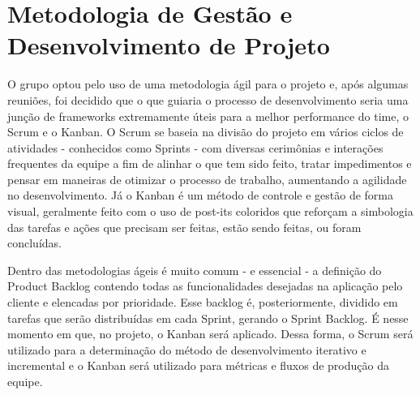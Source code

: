 \section{Metodologia de Gestão e Desenvolvimento de Projeto}
O grupo optou pelo uso de uma metodologia ágil para o projeto e, após algumas reuniões, foi decidido que o que guiaria o processo de desenvolvimento seria uma junção de frameworks extremamente úteis para a melhor performance do time, o Scrum e o Kanban. 
O Scrum se baseia na divisão do projeto em vários ciclos de atividades - conhecidos como Sprints - com diversas cerimônias e interações frequentes da equipe a fim de alinhar o que tem sido feito, tratar impedimentos e pensar em maneiras de otimizar o processo de trabalho, aumentando a agilidade no desenvolvimento. Já o Kanban é um método de controle e gestão de forma visual, geralmente feito com o uso de post-its coloridos que reforçam a simbologia das tarefas e ações que precisam ser feitas, estão sendo feitas, ou foram concluídas. 

Dentro das metodologias ágeis é muito comum - e essencial - a definição do Product Backlog contendo todas as funcionalidades desejadas na aplicação pelo cliente e elencadas por prioridade. Esse backlog é, posteriormente, dividido em tarefas que serão distribuídas em cada Sprint, gerando o Sprint Backlog. É nesse momento em que, no projeto, o Kanban será aplicado. Dessa forma, o Scrum será utilizado para a determinação do método de desenvolvimento iterativo e incremental e o Kanban será utilizado para métricas e fluxos de produção da equipe.